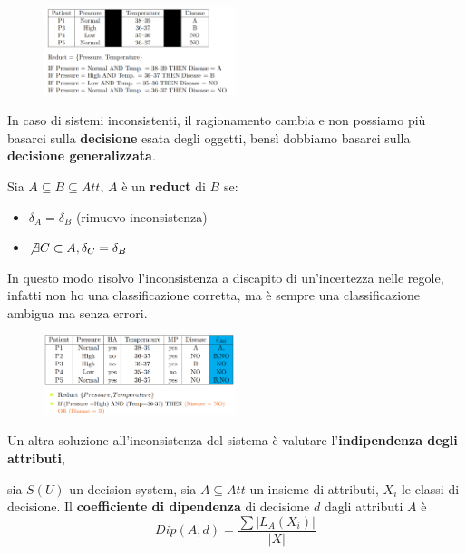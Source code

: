 \begin{figure}[!h]
    \centering
    \includegraphics[width=0.5\textwidth]{img/sistemi_incerti/rule-based-system-rough.png}
\end{figure}

In caso di sistemi inconsistenti, il ragionamento cambia e non possiamo più basarci 
sulla \textbf{decisione} esata degli oggetti, bensì dobbiamo basarci sulla 
\textbf{decisione generalizzata}.

\begin{definizione}
    Sia $A\subseteq B\subseteq Att$, $A$ è un \textbf{reduct} di $B$ se:
    \begin{itemize}
        \item $\delta_A = \delta_B$ (rimuovo inconsistenza)
        \item $\not\exists C \subset A, \delta_C=\delta_B$
    \end{itemize}
\end{definizione}

In questo modo risolvo l'inconsistenza a discapito di un'incertezza nelle regole,
infatti non ho una classificazione corretta, ma è sempre una classificazione ambigua ma senza errori.

\begin{figure}[!h]
    \centering
    \includegraphics[width=0.5\textwidth]{img/sistemi_incerti/rule-based-system-rough-apr.png}
\end{figure}

Un altra soluzione all'inconsistenza del sistema  è valutare l'\textbf{indipendenza degli attributi}, 

\begin{definizione}
    sia $S(U)$ un decision system, sia $A\subseteq Att$ un insieme di attributi,
    $X_i$ le classi di decisione. Il \textbf{coefficiente di dipendenza} di decisione 
    $d$ dagli attributi $A$ è 
    $$Dip(A, d) = \frac{\sum |L_A(X_i)|}{|X|}$$

\end{definizione}

